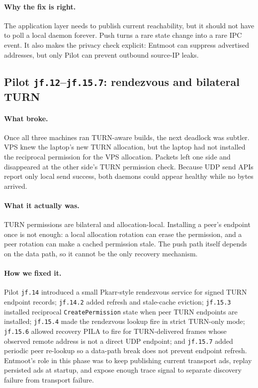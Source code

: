 \documentclass[11pt,a4paper]{article}
\begin{document}
\paragraph{Why the fix is right.} The application layer needs to
publish current reachability, but it should not have to poll a local
daemon forever. Push turns a rare state change into a rare IPC event.
It also makes the privacy check explicit: Entmoot can suppress
advertised addresses, but only Pilot can prevent outbound source-IP
leaks.

\subsection{Pilot \texttt{jf.12}--\texttt{jf.15.7}: rendezvous and
bilateral TURN}

\paragraph{What broke.} Once all three machines ran TURN-aware builds,
the next deadlock was subtler. VPS knew the laptop's new TURN
allocation, but the laptop had not installed the reciprocal permission
for the VPS allocation. Packets left one side and disappeared at the
other side's TURN permission check. Because UDP send APIs report only
local send success, both daemons could appear healthy while no bytes
arrived.

\paragraph{What it actually was.} TURN permissions are bilateral and
allocation-local. Installing a peer's endpoint once is not enough: a
local allocation rotation can erase the permission, and a peer rotation
can make a cached permission stale. The push path itself depends on the
data path, so it cannot be the only recovery mechanism.

\paragraph{How we fixed it.} Pilot \texttt{jf.14} introduced a small
Pkarr-style rendezvous service for signed TURN endpoint records;
\texttt{jf.14.2} added refresh and stale-cache eviction;
\texttt{jf.15.3} installed reciprocal \texttt{CreatePermission} state
when peer TURN endpoints are installed; \texttt{jf.15.4} made the
rendezvous lookup fire in strict TURN-only mode; \texttt{jf.15.6}
allowed recovery PILA to fire for TURN-delivered frames whose observed
remote address is not a direct UDP endpoint; and \texttt{jf.15.7}
added periodic peer re-lookup so a data-path break does not prevent
endpoint refresh. Entmoot's role in this phase was to keep publishing
current transport ads, replay persisted ads at startup, and expose
enough trace signal to separate discovery failure from transport
failure.
\end{document}
